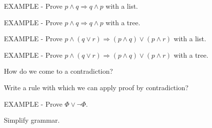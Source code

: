 \documentclass[fleqn]{article}
\begin{document}
\begin{enumerate}
    \item EXAMPLE \-- Prove $p \wedge q \Rightarrow q \wedge p$ with a list.
    \item EXAMPLE \-- Prove $p \wedge q \Rightarrow q \wedge p$ with a tree.
    {\color{red}\item EXAMPLE \-- Prove $p \wedge (q \vee r) \Rightarrow (p \wedge q) \vee (p \wedge r)$ with a list.}
    {\color{red}\item EXAMPLE \-- Prove $p \wedge (q \vee r) \Rightarrow (p \wedge q) \vee (p \wedge r)$ with a tree.}
    \item How do we come to a contradiction?
    {\color{red}\item Write a rule with which we can apply proof by contradiction?}
    {\color{red}\item EXAMPLE \-- Prove $\Phi \vee \neg \Phi$.}
    {\color{red}\item Simplify grammar.}
\end{enumerate}
\end{document}
